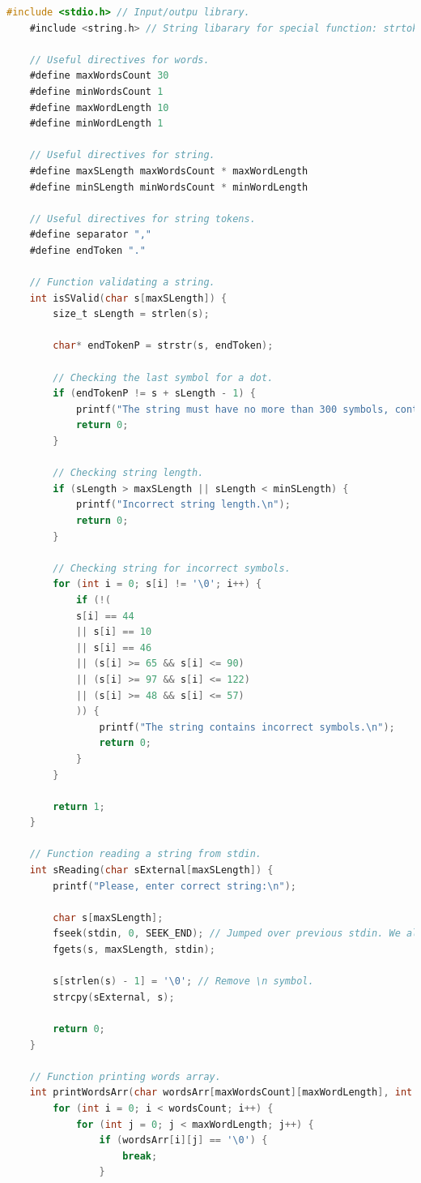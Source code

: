 \documentclass[12pt]{article}
\begin{document}
	\begin{lstlisting}[language=C]
	#include <stdio.h> // Input/outpu library.
	#include <string.h> // String libarary for special function: strtok, strcat etc.
	
	// Useful directives for words.
	#define maxWordsCount 30
	#define minWordsCount 1
	#define maxWordLength 10
	#define minWordLength 1
	
	// Useful directives for string.
	#define maxSLength maxWordsCount * maxWordLength
	#define minSLength minWordsCount * minWordLength
	
	// Useful directives for string tokens.
	#define separator ","
	#define endToken "."
	
	// Function validating a string.
	int isSValid(char s[maxSLength]) {
		size_t sLength = strlen(s);
		
		char* endTokenP = strstr(s, endToken);
		
		// Checking the last symbol for a dot.
		if (endTokenP != s + sLength - 1) {
			printf("The string must have no more than 300 symbols, contain only one dot and end with this dot.\n");
			return 0;
		}
		
		// Checking string length.
		if (sLength > maxSLength || sLength < minSLength) {
			printf("Incorrect string length.\n");
			return 0;
		}
		
		// Checking string for incorrect symbols.
		for (int i = 0; s[i] != '\0'; i++) {
			if (!(
			s[i] == 44
			|| s[i] == 10
			|| s[i] == 46 
			|| (s[i] >= 65 && s[i] <= 90) 
			|| (s[i] >= 97 && s[i] <= 122) 
			|| (s[i] >= 48 && s[i] <= 57)
			)) {
				printf("The string contains incorrect symbols.\n");
				return 0;
			}
		}
		
		return 1;
	}
	
	// Function reading a string from stdin.
	int sReading(char sExternal[maxSLength]) {
		printf("Please, enter correct string:\n");
		
		char s[maxSLength];
		fseek(stdin, 0, SEEK_END); // Jumped over previous stdin. We also can clear stdin here: fflush(stdin);
		fgets(s, maxSLength, stdin);
		
		s[strlen(s) - 1] = '\0'; // Remove \n symbol.
		strcpy(sExternal, s);
		
		return 0;
	}
	
	// Function printing words array.
	int printWordsArr(char wordsArr[maxWordsCount][maxWordLength], int wordsCount) {
		for (int i = 0; i < wordsCount; i++) {
			for (int j = 0; j < maxWordLength; j++) {
				if (wordsArr[i][j] == '\0') {
					break;
				}
				

\end{lstlisting}
\end{document}
